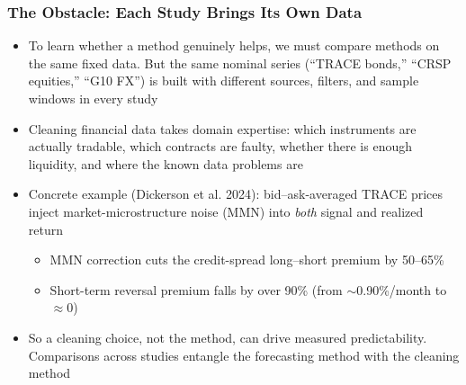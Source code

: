 \documentclass[ignorenonframetext, 9pt]{beamer}
\begin{document}
\begin{frame}
\frametitle{The Obstacle: Each Study Brings Its Own Data}
\begin{itemize}
\item To learn whether a method genuinely helps, we must compare methods on the \alert{same fixed data.} But the same nominal series (``TRACE bonds,'' ``CRSP equities,'' ``G10 FX'') is built with different sources, filters, and sample windows in every study
\vspace{0.2cm}
\item \alert{Cleaning financial data takes domain expertise:} which instruments are actually tradable, which contracts are faulty, whether there is enough liquidity, and where the known data problems are
\vspace{0.2cm}
\item \alert{Concrete example (Dickerson et al. 2024):} bid--ask-averaged TRACE prices inject market-microstructure noise (MMN) into \emph{both} signal and realized return
\begin{itemize}
  \item MMN correction cuts the credit-spread long--short premium by \alert{50--65\%}
  \item Short-term reversal premium falls by \alert{over 90\%} (from $\sim$0.90\%/month to $\approx$0)
\end{itemize}
\vspace{0.2cm}
\item So a cleaning choice, not the method, can drive measured predictability. \alert{Comparisons across studies entangle the forecasting method with the cleaning method}
\end{itemize}
\end{frame}
\end{document}
